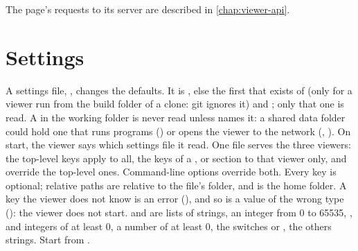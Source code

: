 The page's requests to its server are described in \cref{chap:viewer-api}.

\section{Settings}
\label{sec:vitalstream-settings}

A settings file, , changes the defaults. It is ,
else the first that exists of  (only for a viewer run
from the build folder of a clone: git ignores it) and
; only that one is read. A
 in the working folder is never read unless  names it: a
shared data folder could hold one that runs programs () or opens the viewer
to the network (, ). On start, the viewer says which settings file it
read. One file serves the three viewers: the top-level keys apply to all, the keys
of a \code{[py]}, \code{[rs]} or \code{[cpp]} section to that viewer only, and override the
top-level ones. Command-line options override both. Every key is optional; relative paths are
relative to the file's folder, and \code{\textasciitilde} is the home folder. A key the viewer does
not know is an error (), and so is a value of the wrong type
(): the viewer does not start.  and
 are lists of strings,  an integer from 0 to 65535,
,  and  integers of at least 0,
 a number of at least 0, the switches  or , the others
strings. Start from
.

